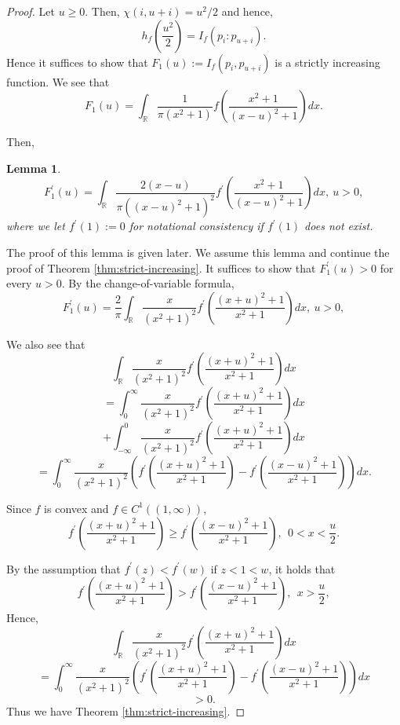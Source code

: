 \documentclass[journal]{IEEEtran}
\newtheorem{lemma}[theorem]{Lemma}
\begin{document}
\begin{proof}
Let $u \ge 0$. 
Then, $\chi(i, u+i) = u^2/2$ and hence, 
\[ h_f \left(  \frac{u^2}{2} \right) = I_f (p_{i}:p_{u+i}). \]
Hence it suffices to show that $F_1(u) := I_f (p_i, p_{u+i})$ is a strictly increasing function. 
We see that 
\[ F_1(u) = \int_{\mathbb R} \frac{1}{\pi (x^2 + 1)} f \left(  \frac{x^2+ 1}{(x-u)^2 + 1}\right) dx. \]

Then, 
\begin{lemma}\label{lem:exchange}
\[ F_1^{\prime}(u) = \int_{\mathbb R} \frac{2(x-u)}{\pi ((x-u)^2 + 1)^2} f^{\prime} \left(  \frac{x^2+ 1}{(x-u)^2 + 1}\right) dx, \ u > 0, \]
where we let $ f^{\prime} \left(  1 \right) := 0$ for notational consistency if $f^{\prime}(1)$ does not exist. 
\end{lemma}

The proof of this lemma is given later. 
We assume this lemma and continue the proof of Theorem \ref{thm:strict-increasing}. 
It suffices to show that $F_1^{\prime}(u) > 0$ for every $u > 0$.   
By the change-of-variable formula, 
\[ F_1^{\prime}(u) = \frac{2}{\pi} \int_{\mathbb R} \frac{x}{(x^2 + 1)^2} f^{\prime} \left(  \frac{(x+u)^2+ 1}{x^2 + 1}\right) dx, \ u > 0,  \]

We also see that 
\[  \int_{\mathbb R} \frac{x}{(x^2 + 1)^2} f^{\prime} \left(  \frac{(x+u)^2+ 1}{x^2 + 1}\right) dx  \]
\[ =  \int_{0}^{\infty} \frac{x}{(x^2 + 1)^2} f^{\prime} \left(  \frac{(x+u)^2+ 1}{x^2 + 1}\right) dx \]
\[+  \int_{-\infty}^{0} \frac{x}{(x^2 + 1)^2} f^{\prime} \left(  \frac{(x+u)^2+ 1}{x^2 + 1}\right) dx\] 
\[ =\!\!\!\int_{0}^{\infty}\!\!\!\!\!\frac{x}{(x^2 + 1)^2}\!\! \left(f^{\prime}\! \left(  \frac{(x+u)^2+ 1}{x^2 + 1}\right) \! - \!f^{\prime}\! \left(  \frac{(x-u)^2+ 1}{x^2 + 1}\right) \right)\!dx. \] 

Since $f$ is convex and $f \in C^1 ((1, \infty))$, 
\[ f^{\prime} \left(  \frac{(x+u)^2+ 1}{x^2 + 1}\right) \ge f^{\prime} \left(  \frac{(x-u)^2+ 1}{x^2 + 1}\right), \ \ 0 < x < \frac{u}{2}. \]

By the assumption that $f^{\prime}(z) < f^{\prime}(w)$ if $z < 1 < w$,  
it holds that 
\begin{equation*}
f^{\prime} \left(  \frac{(x+u)^2+ 1}{x^2 + 1}\right) > f^{\prime} \left(  \frac{(x-u)^2+ 1}{x^2 + 1}\right), \ \ x > \frac{u}{2}, 
\end{equation*}
Hence, 
\[  \int_{\mathbb R} \frac{x}{(x^2 + 1)^2} f^{\prime} \left(  \frac{(x+u)^2+ 1}{x^2 + 1}\right) dx \]
\[ =\!\!\!\int_{0}^{\infty}\!\!\!\!\!\frac{x}{(x^2 + 1)^2}\!\! \left(f^{\prime}\! \left(  \frac{(x+u)^2+ 1}{x^2 + 1}\right) \! - \!f^{\prime}\! \left(  \frac{(x-u)^2+ 1}{x^2 + 1}\right) \right)\!dx \] 
\[> 0.  \] 
Thus we have Theorem \ref{thm:strict-increasing}. 
\end{proof}
\end{document}

